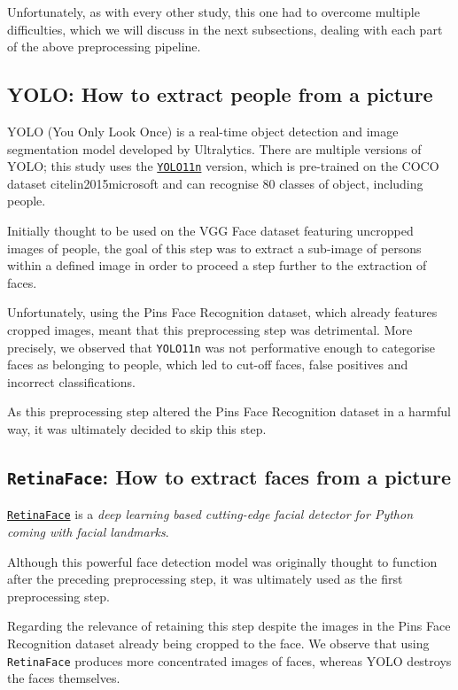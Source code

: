 \documentclass[9pt,twocolumn,twoside]{ilcss}
\theoremstyle{definition}
\theoremstyle{remark}
\theoremstyle{definition}
\theoremstyle{definition}
\begin{document}
    Unfortunately, as with every other study, this one had to overcome multiple difficulties, which we will discuss in the next subsections, dealing with each part of the above preprocessing pipeline.

    \subsection{YOLO: How to extract people from a picture}
        YOLO (You Only Look Once) is a real-time object detection and image segmentation model developed by Ultralytics. There are multiple versions of YOLO; this study uses the \href{https://docs.ultralytics.com/models/yolo11/}{\texttt{YOLO11n}} version, which is pre-trained on the COCO dataset cite{lin2015microsoft} and can recognise 80 classes of object, including people.
        
        Initially thought to be used on the VGG Face dataset featuring uncropped images of people, the goal of this step was to extract a sub-image of persons within a defined image in order to proceed a step further to the extraction of faces.
        
        Unfortunately, using the Pins Face Recognition dataset, which already features cropped images, meant that this preprocessing step was detrimental.
        More precisely, we observed that \texttt{YOLO11n} was not performative enough to categorise faces as belonging to people, which led to cut-off faces, false positives and incorrect classifications. 
        
        As this preprocessing step altered the Pins Face Recognition dataset in a harmful way, it was ultimately decided to skip this step.
    
    \subsection{\texttt{RetinaFace}: How to extract faces from a picture}
        \href{https://github.com/serengil/retinaface}{\texttt{RetinaFace}} is a \textit{deep learning based cutting-edge facial detector for Python coming with facial landmarks}. 
        
        Although this powerful face detection model was originally thought to function after the preceding preprocessing step, it was ultimately used as the first preprocessing step.

        Regarding the relevance of retaining this step despite the images in the Pins Face Recognition dataset already being cropped to the face. We observe that using \texttt{RetinaFace} produces more concentrated images of faces, whereas YOLO destroys the faces themselves.  
        
\end{document}
